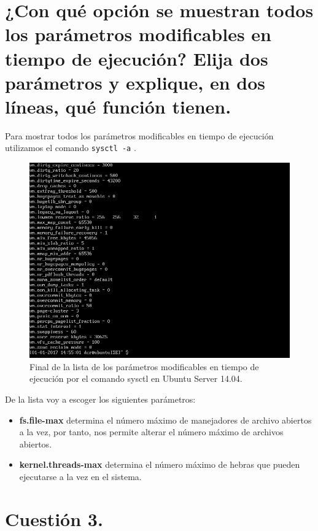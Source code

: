 \section{¿Con qué opción se muestran todos los parámetros modificables en tiempo de ejecución? Elija dos parámetros y explique, en dos líneas, qué función tienen.}
Para mostrar todos los parámetros modificables en tiempo de ejecución utilizamos el comando \verb|sysctl -a| \cite{c2}.
\begin{figure}[H]
	\centering
	\includegraphics[scale=0.4]{listSysctl.png}
	\caption{Final de la lista de los parámetros modificables en tiempo de ejecución por el comando sysctl en Ubuntu Server 14.04.}
\end{figure}

De la lista voy a escoger los siguientes parámetros:
\begin{itemize}
	\item \textbf{fs.file-max} determina el número máximo de manejadores de archivo abiertos a la vez, por tanto, nos permite alterar el número máximo de archivos abiertos. \cite{c2a}
	\item \textbf{kernel.threads-max} determina el número máximo de hebras que pueden ejecutarse a la vez en el sistema. \cite{c2b}
\end{itemize}
\section{Cuestión 3.}
